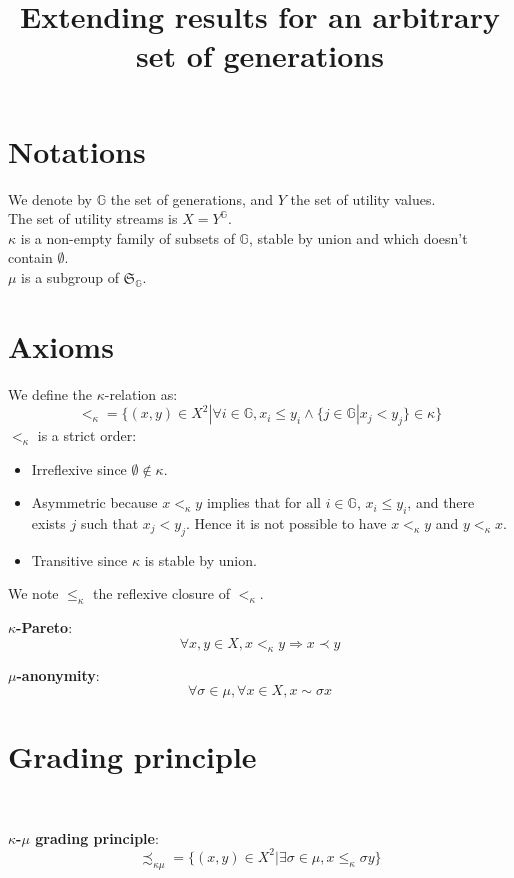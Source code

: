 \documentclass{article}
\title{Extending results for an arbitrary set of generations}
\author{}
\newcommand{\G}{\mathbb{G}}
\begin{document}
\maketitle

\section{Notations}

We denote by $\G$ the set of generations, and $Y$ the set of utility values.\\
The set of utility streams is $X=Y^\G$.\\
$\kappa$ is a non-empty family of subsets of $\G$, stable by union and which doesn't
contain $\emptyset$.\\
$\mu$ is a subgroup of $\mathfrak{S}_\G$.

\section{Axioms}

We define the $\kappa$-relation as:
\[<_\kappa = \{(x,y)\in X^2|\forall i\in \G, x_i \leq y_i \land
\{j \in \G | x_j < y_j\}\in\kappa\}\]
$<_\kappa$ is a strict order:
\begin{itemize}
  \item Irreflexive since $\emptyset\not\in\kappa$.
  \item Asymmetric because $x<_\kappa y$ implies that for all $i\in\G$,
        $x_i\leq y_i$, and there exists $j$ such that $x_j < y_j$. Hence
        it is not possible to have $x<_\kappa y$ and $y<_\kappa x$.
  \item Transitive since $\kappa$ is stable by union.
\end{itemize}
We note $\leq_\kappa$ the reflexive closure of $<_\kappa$.\smallskip\par

\textbf{$\kappa$-Pareto}:
\[\forall x,y\in X, x <_\kappa y \Rightarrow x \prec y\]

\textbf{$\mu$-anonymity}:
\[\forall\sigma\in\mu,\forall x\in X, x \sim \sigma x\]

\section{Grading principle}
\ \par
\textbf{$\kappa$-$\mu$ grading principle}:
\[\precsim_{\kappa\mu} = \{(x,y)\in X^2 |
\exists\sigma\in\mu, x \leq_\kappa \sigma y\}\]
\end{document}

